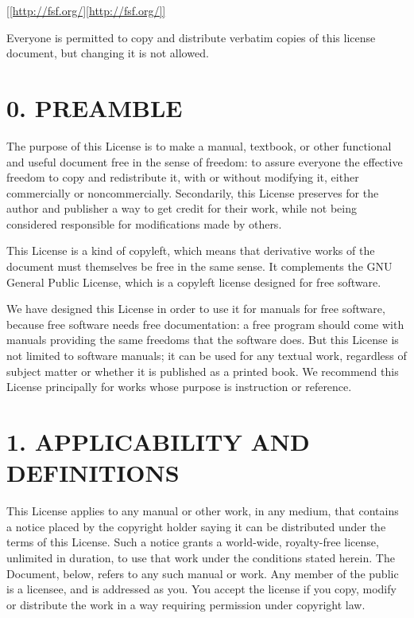 \documentclass[captions=tableheading]{scrbook}
\begin{document}
\begin{center}
\url{[[http://fsf.org/][http://fsf.org/]]}
\par\end{center}

\noindent Everyone is permitted to copy and distribute verbatim copies of this license document, but changing it is not allowed.
\section{0. PREAMBLE}
\label{sec-3-1}


The purpose of this License is to make a manual, textbook, or other functional and useful document free  in the sense of freedom: to assure everyone the effective freedom to copy and redistribute it, with or without modifying it, either commercially or noncommercially. Secondarily, this License preserves for the author and publisher a way to get credit for their work, while not being considered responsible for modifications made by others.

This License is a kind of copyleft, which means that derivative works of the document must themselves be free in the same sense. It complements the GNU General Public License, which is a copyleft license designed for free software.

We have designed this License in order to use it for manuals for free software, because free software needs free documentation: a free program should come with manuals providing the same freedoms that the software does. But this License is not limited to software manuals; it can be used for any textual work, regardless of subject matter or whether it is published as a printed book. We recommend this License principally for works whose purpose is instruction or reference.
\section{1. APPLICABILITY AND DEFINITIONS}
\label{sec-3-2}


This License applies to any manual or other work, in any medium, that contains a notice placed by the copyright holder saying it can be distributed under the terms of this License. Such a notice grants a world-wide, royalty-free license, unlimited in duration, to use that work under the conditions stated herein. The Document, below, refers to any such manual or work. Any member of the public is a licensee, and is addressed as you. You accept the license if you copy, modify or distribute the work in a way requiring permission under copyright law.
\end{document}
